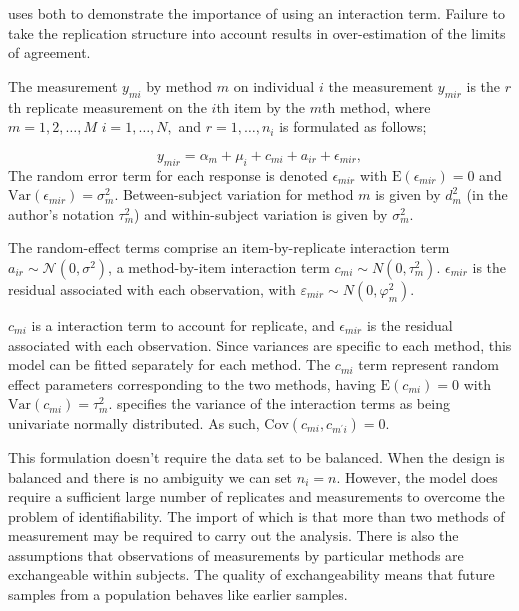 \documentclass[12pt, a4paper]{report}
\theoremstyle{plain}
\theoremstyle{definition}
\theoremstyle{remark}
\begin{document}
\citet{BXC2008} uses both to demonstrate the importance of using an interaction term. Failure to take the replication structure into account results in over-estimation of the limits of agreement.

The measurement $y_{mi}$ by method $m$ on individual $i$ the measurement $y_{mir} $ is the $r$th replicate measurement on the $i$th item by the $m$th method, where $m=1,2,\ldots,M$ $i=1,\ldots,N,$ and $r = 1,\ldots,n_i$ is formulated as follows;


\begin{equation}
y_{mir}  = \alpha_{m} + \mu_{i} + c_{mi} + a_{ir} + \epsilon_{mir},
\label{BXC-full}
\end{equation}
The random error term for each response is denoted $\epsilon_{mir}$ with $\mathrm{E}(\epsilon_{mir})=0$ and $\mathrm{Var}(\epsilon_{mir})=\sigma^2_m$. Between-subject variation for method $m$ is given by $d^2_{m}$ (in the author's notation $\tau^2_m$) and within-subject variation is given by $\sigma^2_{m}$.

The random-effect terms comprise an item-by-replicate interaction term $a_{ir} \sim \mathcal{N}(0,\sigma^{2})$, a method-by-item interaction term $c_{mi} \sim N(0,\tau^{2}_{m})$. $\epsilon_{mir}$ is the residual associated with each observation, with $\varepsilon_{mir} \sim N(0,\varphi^{2}_{m})$.

$c_{mi}$ is a interaction term to account for replicate, and $\epsilon_{mir}$ is the residual associated with each observation. Since variances are specific to each method, this model can be
fitted separately for each method. The $c_{mi}$ term represent random effect parameters corresponding to the two methods, having $\mathrm{E}(c_{mi})= 0$ with $\mathrm{Var}(c_{mi})=\tau^2_m$. \citet{BXC2008} specifies the variance of the interaction terms as being univariate normally distributed. As such, $\mathrm{Cov}(c_{mi}, c_{m^\prime i})= 0.$

This formulation doesn't require the data set to be balanced. When the design is balanced and there is no ambiguity we can set $n_i=n$. However, the model does require a sufficient large number of replicates and measurements to overcome the problem of identifiability. The import of which is that more than two methods of measurement may be required to carry out the analysis. There is also the assumptions that observations of measurements by particular methods are exchangeable within subjects. The quality of exchangeability means that future samples from a population behaves like earlier samples.
\end{document}
